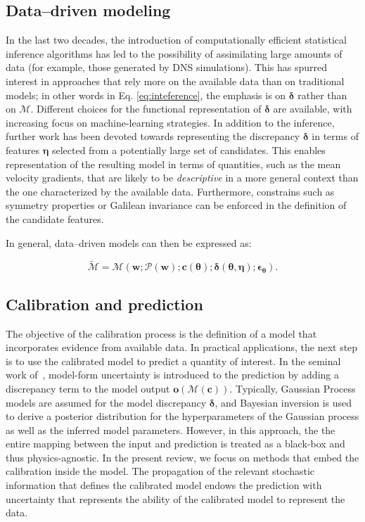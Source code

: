 \documentclass[a4paper]{ar-1col}
\begin{document}
\subsection{Data--driven modeling}

In the last two decades, the introduction of computationally efficient statistical inference algorithms has led to the possibility of assimilating large amounts of data (for example, those generated by DNS simulations). This   has spurred  interest in approaches that rely more on the available data than on traditional  models; in other words 
in  Eq. \ref{eq:inteference}, the emphasis is on $ \bm{\delta}$ rather than on $\mathcal M$. Different choices for the functional representation of $ \bm{\delta}$ are
available, with increasing focus on  machine-learning strategies. 
In addition to the inference, further work has been devoted towards representing the
  discrepancy $ \bm{\delta}$ in terms of  features $\bm{\eta}$ selected from  a potentially large set of candidates. This enables representation of the resulting model 
  in terms of quantities, such as the mean velocity gradients, that are likely to be {\it descriptive} in a more general context than the one characterized by the available data.
  Furthermore,  constrains such as symmetry properties or Galilean invariance  can be enforced in the definition of the candidate features.  
  
In general, data--driven models can then be expressed as:

  \begin{equation}
 \widetilde{ \mathcal M} = \mathcal M (   \mathbf{w}; \mathcal P(  \mathbf{w}  );    \mathbf{c}(\bm{\theta}); \bm{\delta}{(\bm{\theta},\bm{\eta})};   \bm{\epsilon}_{\bm{\theta}}  ).   
 \label{eq:datadriven} 
 \end{equation}



\subsection{Calibration and prediction}

The objective of the calibration process is the definition of a model that incorporates evidence from available data. In practical applications, the 
next step is to use  the calibrated model to predict a quantity of interest. 
In the seminal work of~\citet{kennedy2001bayesian}, model-form uncertainty is introduced to the
 prediction by adding a discrepancy term to the model output $\bm{o}(\mathcal{M}(\bm{c}))$. 
Typically, Gaussian Process models are assumed for the model discrepancy $\bm{\delta}$, and Bayesian inversion is used to
derive a posterior distribution for the hyperparameters of the Gaussian process as well as the inferred model parameters.
However, in this approach, the the entire mapping between the input and  prediction is treated as a black-box and thus physics-agnostic.
In the present review, we focus on methods that embed the calibration inside the model.
The propagation of the relevant stochastic information that defines the calibrated model endows the prediction with 
uncertainty  that represents the ability of the calibrated model to represent the data.  
\end{document}
